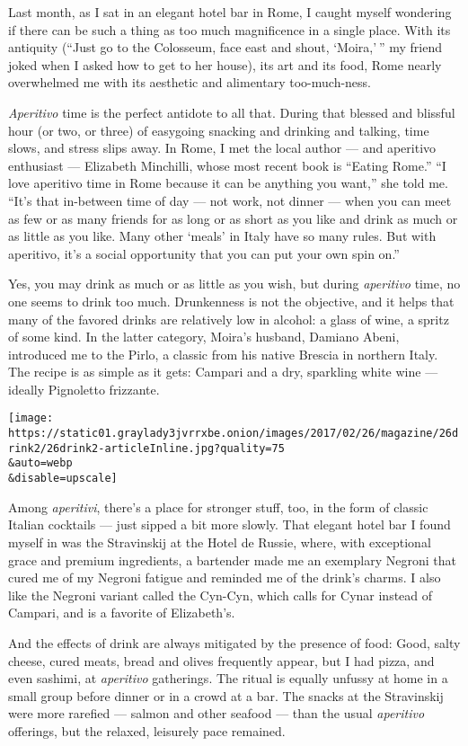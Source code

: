 Last month, as I sat in an elegant hotel bar in Rome, I caught myself
wondering if there can be such a thing as too much magnificence in a
single place. With its antiquity (``Just go to the Colosseum, face east
and shout, `Moira,' '' my friend joked when I asked how to get to her
house), its art and its food, Rome nearly overwhelmed me with its
aesthetic and alimentary too-much-ness.

\emph{Aperitivo} time is the perfect antidote to all that. During that
blessed and blissful hour (or two, or three) of easygoing snacking and
drinking and talking, time slows, and stress slips away. In Rome, I met
the local author --- and aperitivo enthusiast --- Elizabeth Minchilli,
whose most recent book is ``Eating Rome.'' ``I love aperitivo time in
Rome because it can be anything you want,'' she told me. ``It's that
in-between time of day --- not work, not dinner --- when you can meet as
few or as many friends for as long or as short as you like and drink as
much or as little as you like. Many other `meals' in Italy have so many
rules. But with aperitivo, it's a social opportunity that you can put
your own spin on.''

Yes, you may drink as much or as little as you wish, but during
\emph{aperitivo} time, no one seems to drink too much. Drunkenness is
not the objective, and it helps that many of the favored drinks are
relatively low in alcohol: a glass of wine, a spritz of some kind. In
the latter category, Moira's husband, Damiano Abeni, introduced me to
the Pirlo, a classic from his native Brescia in northern Italy. The
recipe is as simple as it gets: Campari and a dry, sparkling white wine
--- ideally Pignoletto frizzante.

\texttt{[image: https://static01.graylady3jvrrxbe.onion/images/2017/02/26/magazine/26drink2/26drink2-articleInline.jpg?quality=75\\\&auto=webp\\\&disable=upscale]}

Among \emph{aperitivi}, there's a place for stronger stuff, too, in the
form of classic Italian cocktails --- just sipped a bit more slowly.
That elegant hotel bar I found myself in was the Stravinskij at the
Hotel de Russie, where, with exceptional grace and premium ingredients,
a bartender made me an exemplary Negroni that cured me of my Negroni
fatigue and reminded me of the drink's charms. I also like the Negroni
variant called the Cyn-Cyn, which calls for Cynar instead of Campari,
and is a favorite of Elizabeth's.

And the effects of drink are always mitigated by the presence of food:
Good, salty cheese, cured meats, bread and olives frequently appear, but
I had pizza, and even sashimi, at \emph{aperitivo} gatherings. The
ritual is equally unfussy at home in a small group before dinner or in a
crowd at a bar. The snacks at the Stravinskij were more rarefied ---
salmon and other seafood --- than the usual \emph{aperitivo} offerings,
but the relaxed, leisurely pace remained.

